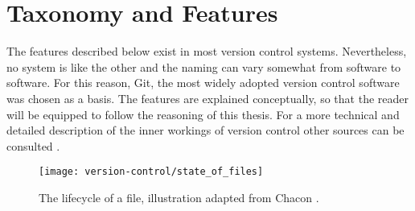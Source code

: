 

\section{Taxonomy and Features}
The features described below exist in most version control systems. Nevertheless, no system is like the other and the naming can vary somewhat from software to software. For this reason, Git, the most widely adopted version control software \cite{_stack_2015} was chosen as a basis. The features are explained conceptually, so that the reader will be equipped to follow the reasoning of this thesis. For a more technical and detailed description of the inner workings of version control other sources can be consulted \cite{baudis_current_2009,chacon_pro_2009,pilato_version_2008}.

\begin{figure}
 \centering
 \texttt{[image: version-control/state\_of\_files]}
 \caption{The lifecycle of a file, illustration adapted from Chacon \cite[p.~45]{chacon_pro_2009}.}
 \label{fig:file-state}
\end{figure}

